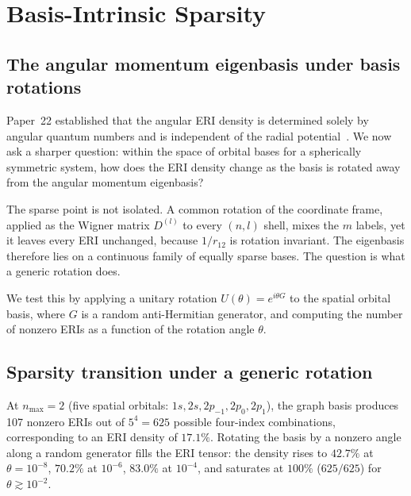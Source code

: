 \documentclass[twocolumn,pra,amsmath,amssymb,superscriptaddress]{revtex4-2}
\newcommand{\gvq}[2]{#2}
\begin{document}
\section{Basis-Intrinsic Sparsity}
\label{sec:sparsity}

\subsection{The angular momentum eigenbasis under basis rotations}

Paper~22 established that the angular ERI density is determined
solely by angular quantum numbers and is independent of the radial
potential~\cite{GeoVac_Paper22}.  We now ask a sharper question:
within the space of orbital bases for a spherically symmetric
system, how does the ERI density change as the basis is rotated
away from the angular momentum eigenbasis?

The sparse point is not isolated.  A common rotation of the
coordinate frame, applied as the Wigner matrix $D^{(l)}$ to every
$(n,l)$ shell, mixes the $m$ labels, yet it leaves every ERI
unchanged, because $1/r_{12}$ is rotation invariant.  The
eigenbasis therefore lies on a continuous family of equally sparse
bases.  The question is what a generic rotation does.

We test this by applying a unitary rotation
$U(\theta) = e^{i \theta G}$ to the spatial orbital basis, where
$G$ is a random anti-Hermitian generator, and computing the number
of nonzero ERIs as a function of the rotation angle $\theta$.

\subsection{Sparsity transition under a generic rotation}

At $n_{\max} = 2$ (five spatial orbitals: $1s, 2s, 2p_{-1}, 2p_0,
2p_1$), the graph basis produces \gvq{block_sp_n2_eri}{107} nonzero ERIs out of
$5^4 = 625$ possible four-index combinations, corresponding to an
ERI density of $17.1\%$.  Rotating the basis by a nonzero angle
along a random generator fills the ERI tensor: the density rises to
$42.7\%$ at $\theta = 10^{-8}$, $70.2\%$ at $10^{-6}$, $83.0\%$ at
$10^{-4}$, and saturates at $100\%$ ($625/625$) for
$\theta \gtrsim 10^{-2}$.
\end{document}
